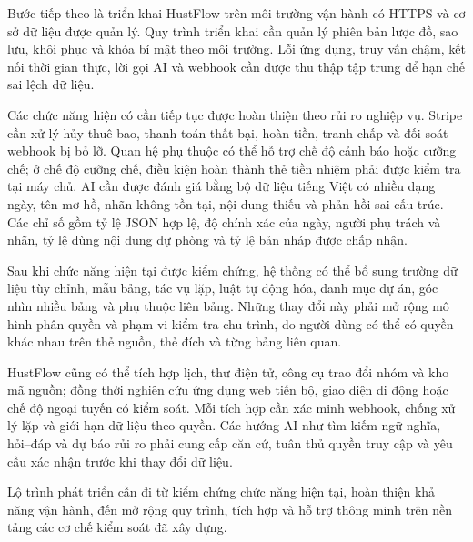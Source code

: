 \documentclass[../DoAn.tex]{subfiles}
\begin{document}
Bước tiếp theo là triển khai HustFlow trên môi trường vận hành có HTTPS và cơ sở dữ liệu được quản lý. Quy trình triển khai cần quản lý phiên bản lược đồ, sao lưu, khôi phục và khóa bí mật theo môi trường. Lỗi ứng dụng, truy vấn chậm, kết nối thời gian thực, lời gọi AI và webhook cần được thu thập tập trung để hạn chế sai lệch dữ liệu.

Các chức năng hiện có cần tiếp tục được hoàn thiện theo rủi ro nghiệp vụ. Stripe cần xử lý hủy thuê bao, thanh toán thất bại, hoàn tiền, tranh chấp và đối soát webhook bị bỏ lỡ. Quan hệ phụ thuộc có thể hỗ trợ chế độ cảnh báo hoặc cưỡng chế; ở chế độ cưỡng chế, điều kiện hoàn thành thẻ tiền nhiệm phải được kiểm tra tại máy chủ. AI cần được đánh giá bằng bộ dữ liệu tiếng Việt có nhiều dạng ngày, tên mơ hồ, nhãn không tồn tại, nội dung thiếu và phản hồi sai cấu trúc. Các chỉ số gồm tỷ lệ JSON hợp lệ, độ chính xác của ngày, người phụ trách và nhãn, tỷ lệ dùng nội dung dự phòng và tỷ lệ bản nháp được chấp nhận.

Sau khi chức năng hiện tại được kiểm chứng, hệ thống có thể bổ sung trường dữ liệu tùy chỉnh, mẫu bảng, tác vụ lặp, luật tự động hóa, danh mục dự án, góc nhìn nhiều bảng và phụ thuộc liên bảng. Những thay đổi này phải mở rộng mô hình phân quyền và phạm vi kiểm tra chu trình, do người dùng có thể có quyền khác nhau trên thẻ nguồn, thẻ đích và từng bảng liên quan.

HustFlow cũng có thể tích hợp lịch, thư điện tử, công cụ trao đổi nhóm và kho mã nguồn; đồng thời nghiên cứu ứng dụng web tiến bộ, giao diện di động hoặc chế độ ngoại tuyến có kiểm soát. Mỗi tích hợp cần xác minh webhook, chống xử lý lặp và giới hạn dữ liệu theo quyền. Các hướng AI như tìm kiếm ngữ nghĩa, hỏi--đáp và dự báo rủi ro phải cung cấp căn cứ, tuân thủ quyền truy cập và yêu cầu xác nhận trước khi thay đổi dữ liệu.

Lộ trình phát triển cần đi từ kiểm chứng chức năng hiện tại, hoàn thiện khả năng vận hành, đến mở rộng quy trình, tích hợp và hỗ trợ thông minh trên nền tảng các cơ chế kiểm soát đã xây dựng.
\end{document}
